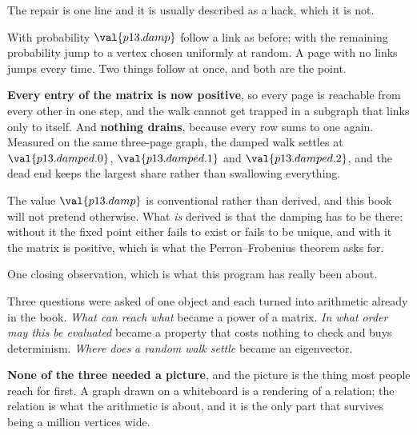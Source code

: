 \begin{fr}
The repair is one line and it is usually described as a hack, which it is not.

With probability $\val{p13.damp}$ follow a link as before; with the remaining
probability jump to a vertex chosen uniformly at random. A page with no links
jumps every time. Two things follow at once, and both are the point.

\textbf{Every entry of the matrix is now positive}, so every page is reachable
from every other in one step, and the walk cannot get trapped in a subgraph
that links only to itself. And \textbf{nothing drains}, because every row sums
to one again. Measured on the same three-page graph, the damped walk settles
at $\val{p13.damped.0}$, $\val{p13.damped.1}$ and $\val{p13.damped.2}$, and
the dead end keeps the largest share rather than swallowing everything.

\begin{note}
The value $\val{p13.damp}$ is conventional rather than derived, and this book
will not pretend otherwise. What \emph{is} derived is that the damping has to
be there: without it the fixed point either fails to exist or fails to be
unique, and with it the matrix is positive, which is what the
Perron--Frobenius theorem asks for.
\end{note}
\end{fr}

\begin{fr}
One closing observation, which is what this program has really been about.

Three questions were asked of one object and each turned into arithmetic
already in the book. \emph{What can reach what} became a power of a matrix.
\emph{In what order may this be evaluated} became a property that costs
nothing to check and buys determinism. \emph{Where does a random walk settle}
became an eigenvector.

\textbf{None of the three needed a picture}, and the picture is the thing most
people reach for first. A graph drawn on a whiteboard is a rendering of a
relation; the relation is what the arithmetic is about, and it is the only
part that survives being a million vertices wide.
\end{fr}

